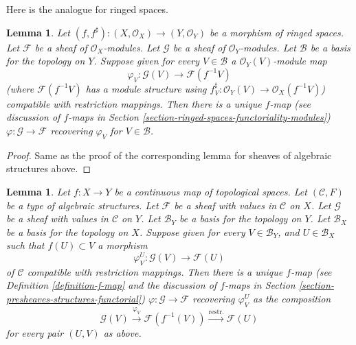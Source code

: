 \documentclass{stacks-project}
\theoremstyle{plain}
\newtheorem{lemma}[subsection]{Lemma}
\theoremstyle{definition}
\theoremstyle{remark}
\numberwithin{equation}{subsection}
\begin{document}
\noindent
Here is the analogue for ringed spaces.

\begin{lemma}
\label{lemma-f-map-basis-below-modules}
Let $(f, f^\sharp) : (X, \mathcal{O}_X) \to (Y, \mathcal{O}_Y)$
be a morphism of ringed spaces.
Let $\mathcal{F}$ be a sheaf of $\mathcal{O}_X$-modules.
Let $\mathcal{G}$ be a sheaf of $\mathcal{O}_Y$-modules.
Let $\mathcal{B}$ be a basis for the topology on $Y$.
Suppose given for every $V \in \mathcal{B}$ a
$\mathcal{O}_Y(V)$-module map
$$
\varphi_V :
\mathcal{G}(V)
\longrightarrow
\mathcal{F}(f^{-1}V)
$$
(where $\mathcal{F}(f^{-1}V)$ has a module structure using
$f^\sharp_V : \mathcal{O}_Y(V) \to \mathcal{O}_X(f^{-1}V)$)
compatible with restriction mappings.
Then there is a unique $f$-map (see discussion of $f$-maps in
Section \ref{section-ringed-spaces-functoriality-modules})
$\varphi : \mathcal{G} \to \mathcal{F}$
recovering $\varphi_V$ for $V \in \mathcal{B}$.
\end{lemma}

\begin{proof}
Same as the proof of the corresponding lemma
for sheaves of algebraic structures above.
\end{proof}

\begin{lemma}
\label{lemma-f-map-basis-above-and-below-structures}
Let $f : X \to Y$ be a continuous map of topological spaces.
Let $(\mathcal{C}, F)$ be a type of algebraic structures.
Let $\mathcal{F}$ be a sheaf with values in $\mathcal{C}$ on $X$.
Let $\mathcal{G}$ be a sheaf with values in $\mathcal{C}$ on $Y$.
Let $\mathcal{B}_Y$ be a basis for the topology on $Y$.
Let $\mathcal{B}_X$ be a basis for the topology on $X$.
Suppose given for every $V \in \mathcal{B}_Y$, and
$U \in \mathcal{B}_X$ such that $f(U) \subset V$ a morphism
$$
\varphi_V^U :
\mathcal{G}(V)
\longrightarrow
\mathcal{F}(U)
$$
of $\mathcal{C}$ compatible with restriction mappings.
Then there is a unique $f$-map (see
Definition \ref{definition-f-map} and the discussion
of $f$-maps in Section \ref{section-presheaves-structures-functorial})
$\varphi : \mathcal{G} \to \mathcal{F}$
recovering $\varphi_V^U$ as the composition
$$
\mathcal{G}(V) \xrightarrow{\varphi_V}
\mathcal{F}(f^{-1}(V)) \xrightarrow{\text{restr.}}
\mathcal{F}(U)
$$
for every pair $(U, V)$ as above.
\end{lemma}
\end{document}
